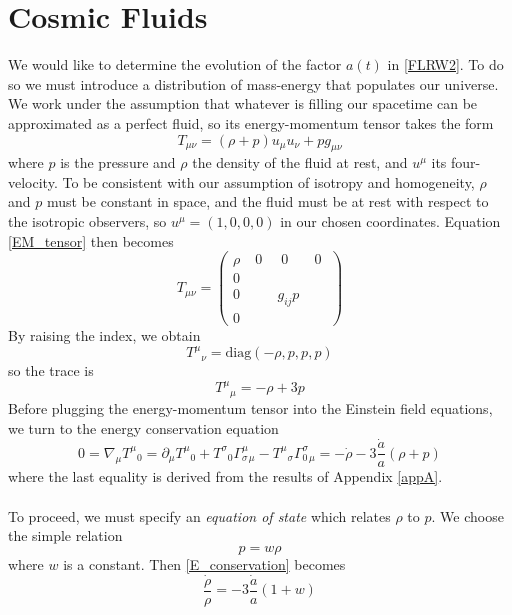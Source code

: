 \documentclass[12pt,letterpaper]{article}         %
\newcommand\para{\paragraph{}}
\begin{document}
\section{Cosmic Fluids}
We would like to determine the evolution of the factor $a(t)$ in \eqref{FLRW2}. To do so we must introduce a distribution of mass-energy that populates our universe. We work under the assumption that whatever is filling our spacetime can be approximated as a perfect fluid, so its energy-momentum tensor takes the form 
\begin{equation}
    T_{\mu \nu} = (\rho + p) u_\mu u_\nu + pg_{\mu \nu} 
    \label{EM_tensor}
\end{equation}
where $p$ is the pressure and $\rho$ the density of the fluid at rest, and $u^\mu$ its four-velocity. To be consistent with our assumption of isotropy and homogeneity, $\rho$ and $p$ must be constant in space, and the fluid must be at rest with respect to the isotropic observers, so $u^\mu = (1,0,0,0)$ in our chosen coordinates. Equation \eqref{EM_tensor} then becomes
\begin{equation}
T_{\mu\nu} = \begin{pmatrix} 
\rho & \; 0 \; & \; 0 \; & \; 0 \; \\ 
0 & & & \\ 
0 & & g_{ij} p & \\ 
0 & & & 
\end{pmatrix}
\end{equation}
By raising the index, we obtain\[
T^\mu{}_\nu = \text{diag}(-\rho, p,p,p)
\]
so the trace is
\begin{equation}
    T^\mu{}_\mu = -\rho + 3p
    \label{EM_trace}
\end{equation}
Before plugging the energy-momentum tensor into the Einstein field equations, we turn to the energy conservation equation \begin{equation}
    0 = \nabla_\mu T^\mu{}_0 = \partial_\mu T^\mu{}_0 + T^\sigma{}_0 \Gamma^{\mu}_\sigma{}_\mu - T^\mu{}_\sigma \Gamma^\sigma_0{}_\mu = - \dot{\rho} - 3 \frac{\dot{a}}{a}(\rho + p)
    \label{E_conservation}
\end{equation}
where the last equality is derived from the results of Appendix \ref{appA}.
\para
To proceed, we must specify an \emph{equation of state} which relates $\rho$ to $p$. We choose the simple relation \[
    p = w \rho
\]
where $w$ is a constant. Then \eqref{E_conservation} becomes
\begin{equation}
    \frac{\dot{\rho}}{\rho} = - 3 \frac{\dot{a}}{a}(1+w)
    \label{rho_hubble_relation}
\end{equation}
\end{document}
